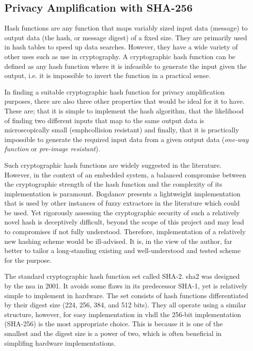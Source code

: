 \subsection{Privacy Amplification with SHA-256}

Hash functions are any function that maps variably sized input data (message) to
output data (the hash, or message digest) of a fixed size. They are primarily
used in hash tables to speed up data searches. However, they have a wide variety
of other uses such as use in cryptography. A cryptographic hash function can be
defined as any hash function where it is infeasible to generate the input given
the output, i.e. it is impossible to invert the function in a practical sense.

In finding a suitable cryptographic hash function for privacy amplification
purposes, there are also three other properties that would be ideal for it to
have. These are; that it is simple to implement the hash algorithm, that the
likelihood of finding two different inputs that map to the same output data is
microscopically small (emph{collision resistant}) and finally, that it is practically
impossible to generate the required input data from a given output data
(\emph{one-way function} or \emph{pre-image resistant}).

Such cryptographic hash functions are widely suggested in the literature.
However, in the context of an embedded system, a balanced compromise between
the cryptographic strength of the hash function and the complexity of its
implementation is paramount.
Bogdanov\cite{bogdanov2011spongent} presents a lightweight implementation that
is used by other instances of fuzzy extractors in the literature
\cite{maes2013puf, van2012reverse} which could be used. Yet rigorously assessing
the cryptographic security of such a relatively novel hash is deceptively
difficult, beyond the
scope of this project and may lead to compromises if not fully understood.
Therefore, implementation of a relatively new hashing scheme would be ill-advised.
It is, in the view of the author, far better to tailor a long-standing existing
and well-understood and tested scheme for the purpose.

The standard cryptographic hash function set called SHA-2.
\gls{sha2} was designed by the \Gls{nsa} in 2001\cite{sklavos2003hardware}.
It avoids some flaws in its predecessor SHA-1, yet is relatively simple
to implement in hardware. The set consists of hash functions differentiated by
their digest size (224, 256, 384, and 512 bits). They all operate using a
similar structure, however, for easy implementation in \gls{vhdl} the 256-bit
implementation (SHA-256) is the most appropriate choice.
This is because it is one of the
smallest and the digest size is a power of two, which is often beneficial in
simplifing hardware implementations.


